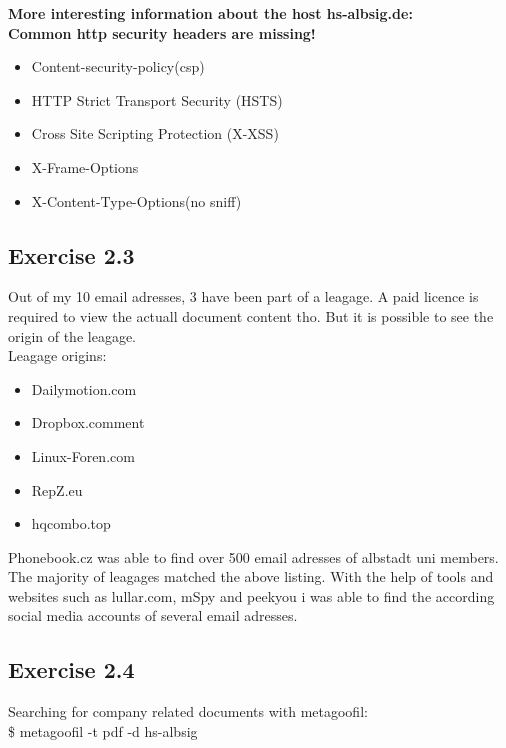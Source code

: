 \documentclass[a4paper,10pt]{article}
\begin{document}
\vspace{5mm}
\noindent \textbf{More interesting information about the host hs-albsig.de:\\
Common http security headers are missing!}\\
\begin{itemize}
\item Content-security-policy(csp)
\item HTTP Strict Transport Security (HSTS)
\item Cross Site Scripting Protection (X-XSS)
\item X-Frame-Options
\item X-Content-Type-Options(no sniff)
 \end{itemize}


\newpage
\subsection{Exercise 2.3}
Out of my 10 email adresses, 3 have been part of a leagage.
A paid licence is required to view the actuall document content tho.
But it is possible to see the origin of the leagage.\\
Leagage origins:
\begin{itemize}
 \item Dailymotion.com
 \item Dropbox.comment
 \item Linux-Foren.com
 \item RepZ.eu
 \item hqcombo.top
\end{itemize}
\vspace{3mm}
Phonebook.cz was able to find over 500 email adresses of albstadt uni members. The majority of leagages matched the above listing.
With the help of tools and websites such as lullar.com, mSpy and peekyou i was able to find the according social media accounts of several email adresses. 

\subsection{Exercise 2.4}
Searching for company related documents with metagoofil:\\
\noindent\$\raisebox{-0.9ex}{\~{}} metagoofil -t pdf -d hs-albsig\\
\end{document}
